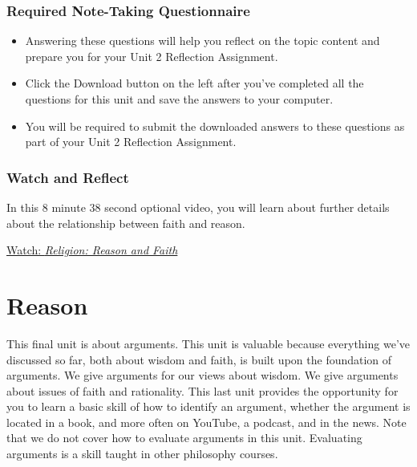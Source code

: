 \documentclass[
]{book}
\providecommand{\tightlist}{%
  \setlength{\itemsep}{0pt}\setlength{\parskip}{0pt}}
\begin{document}
\hypertarget{required-note-taking-questionnaire-6}{%
\subsection*{Required Note-Taking Questionnaire}\label{required-note-taking-questionnaire-6}}

\begin{reflect}
\begin{itemize}
\tightlist
\item
  Answering these questions will help you reflect on the topic content and prepare you for your Unit 2 Reflection Assignment.\\
\item
  Click the Download button on the left after you've completed all the questions for this unit and save the answers to your computer.\\
\item
  You will be required to submit the downloaded answers to these questions as part of your Unit 2 Reflection Assignment.
\end{itemize}
\end{reflect}

\hypertarget{watch-and-reflect-13}{%
\subsection*{Watch and Reflect}\label{watch-and-reflect-13}}

\begin{reflect}
In this 8 minute 38 second optional video, you will learn about further details about the relationship between faith and reason.

\href{https://www.youtube.com/watch?v=MTPHXNMi9tA}{Watch: \emph{Religion: Reason and Faith}}
\end{reflect}

\hypertarget{reason}{%
\chapter{Reason}\label{reason}}

This final unit is about arguments. This unit is valuable because everything we've discussed so far, both about wisdom and faith, is built upon the foundation of arguments. We give arguments for our views about wisdom. We give arguments about issues of faith and rationality. This last unit provides the opportunity for you to learn a basic skill of how to identify an argument, whether the argument is located in a book, and more often on YouTube, a podcast, and in the news. Note that we do not cover how to evaluate arguments in this unit. Evaluating arguments is a skill taught in other philosophy courses.
\end{document}

